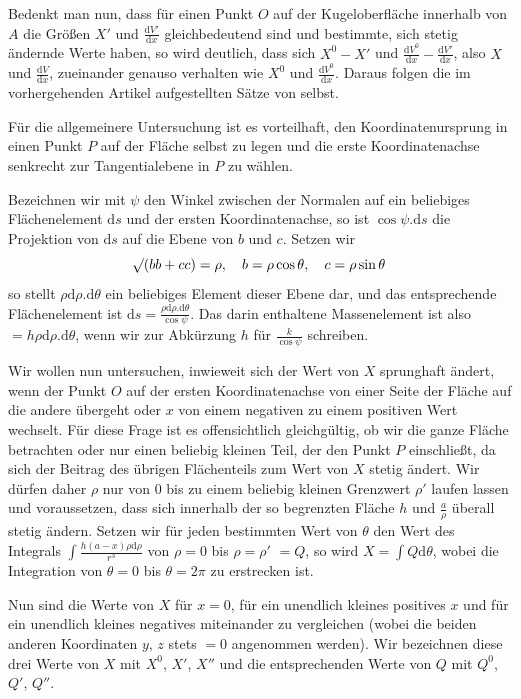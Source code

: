 Bedenkt man nun, dass für einen Punkt $O$ auf der Kugeloberfläche innerhalb von $A$ die Größen $X'$ und $\frac{\mathrm{d}V'}{\mathrm{d}x}$ gleichbedeutend sind und bestimmte, sich stetig ändernde Werte haben, so wird deutlich, dass sich $X^0-X'$ und $\frac{\mathrm{d}V^0}{\mathrm{d}x}-\frac{\mathrm{d}V'}{\mathrm{d}x}$, also $X$ und $\frac{\mathrm{d}V}{\mathrm{d}x}$, zueinander genauso verhalten wie $X^0$ und $\frac{\mathrm{d}V^0}{\mathrm{d}x}$. Daraus folgen die im vorhergehenden Artikel aufgestellten Sätze von selbst.

Für die allgemeinere Untersuchung ist es vorteilhaft, den Koordinatenursprung in einen Punkt $P$ auf der Fläche selbst zu legen und die erste Koordinatenachse senkrecht zur Tangentialebene in $P$ zu wählen.
%

Bezeichnen wir mit $\psi$ den Winkel zwischen der Normalen auf ein beliebiges Flächenelement $\mathrm{d}s$ und der ersten Koordinatenachse, so ist $\cos\psi.\mathrm{d}s$ die Projektion von $\mathrm{d}s$ auf die Ebene von $b$ und $c$. Setzen wir
\[
\mathord{{}^{}\!\surd}(bb+cc)=\rho,\quad b=\rho\cos\theta,\quad c=\rho\sin\theta
\]
so stellt $\rho\mathrm{d}\rho.\mathrm{d}\theta$ ein beliebiges Element dieser Ebene dar, und das entsprechende Flächenelement ist $\mathrm{d}s=\frac{\rho\mathrm{d}\rho.\mathrm{d}\theta}{\cos\psi}$. Das darin enthaltene Massenelement ist also $=h\rho\mathrm{d}\rho.\mathrm{d}\theta$, wenn wir zur Abkürzung $h$ für $\frac{k}{\cos\psi}$ schreiben.

Wir wollen nun untersuchen, inwieweit sich der Wert von $X$ sprunghaft ändert, wenn der Punkt $O$ auf der ersten Koordinatenachse von einer Seite der Fläche auf die andere übergeht oder $x$ von einem negativen zu einem positiven Wert wechselt. Für diese Frage ist es offensichtlich gleichgültig, ob wir die ganze Fläche betrachten oder nur einen beliebig kleinen Teil, der den Punkt $P$ einschließt, da sich der Beitrag des übrigen Flächenteils zum Wert von $X$ stetig ändert. Wir dürfen daher $\rho$ nur von $0$ bis zu einem beliebig kleinen Grenzwert $\rho'$ laufen lassen und voraussetzen, dass sich innerhalb der so begrenzten Fläche $h$ und $\frac{a}{\rho}$ überall stetig ändern. Setzen wir für jeden bestimmten Wert von $\theta$ den Wert des Integrals $\int\frac{h(a-x)\rho\mathrm{d}\rho}{r^3}$ von $\rho=0$ bis $\rho=\rho'$ $=Q$, so wird $X=\int Q\mathrm{d}\theta$, wobei die Integration von $\theta=0$ bis $\theta=2\pi$ zu erstrecken ist.

Nun sind die Werte von $X$ für $x=0$, für ein unendlich kleines positives $x$ und für ein unendlich kleines negatives miteinander zu vergleichen (wobei die beiden anderen Koordinaten $y$, $z$ stets $=0$ angenommen werden). Wir bezeichnen diese drei Werte von $X$ mit $X^0$, $X'$, $X''$ und die entsprechenden Werte von $Q$ mit $Q^0$, $Q'$, $Q''$.

